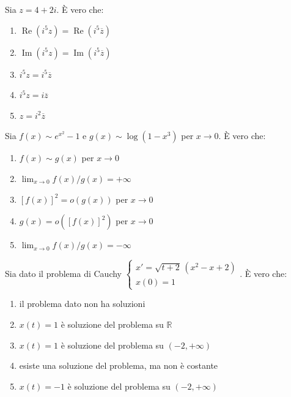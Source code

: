 \begin{quiz}
Sia $z=4+2i$. \`E vero che:
\begin{enumerate}
\item $\operatorname{Re}(i^5z)=\operatorname{Re}(i^5\overline z)$
\item $\operatorname{Im}(i^5z)=\operatorname{Im}(i^5\overline z)$
\item $i^5z=i^5\overline z$
\item $i^5z=i\overline z$
\item $z=i^2\overline z$
\end{enumerate}
\end{quiz}

\begin{quiz}
Sia $f(x)\sim e^{x^2}-1$ e $g(x)\sim\log(1-x^3)$ per $x\to0$. \`E vero che:
\begin{enumerate}
\item $f(x)\sim g(x)$ per $x\to0$
\item $\lim_{x\to0}f(x)/g(x)=+\infty$
\item $[f(x)]^2=o(g(x))$ per $x\to0$
\item $g(x)=o([f(x)]^2)$ per $x\to0$
\item $\lim_{x\to0}f(x)/g(x)=-\infty$
\end{enumerate}
\end{quiz}

\begin{quiz}
Sia dato il problema di Cauchy $\begin{cases}x\prime=\sqrt{t+2}\,(x^2-x+2)\\x(0)=1\end{cases}$. \`E vero che:
\begin{enumerate}
\item il problema dato non ha soluzioni
\item $x(t)=1$ \`e soluzione del problema su $\mathbb R$
\item $x(t)=1$ \`e soluzione del problema su $(-2,+\infty)$
\item esiste una soluzione del problema, ma non \`e costante
\item $x(t)=-1$ \`e soluzione del problema su $(-2,+\infty)$
\end{enumerate}
\end{quiz}

